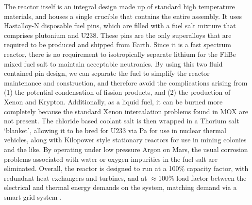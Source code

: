 \documentclass[fleqn,10pt]{Stylesheet} %
\begin{document}
The reactor itself is an integral design made up of standard high temperature materials, and houses a single crucible that contains the entire assembly. It uses Hastalloy-N disposable fuel pins, which are filled with a fuel salt mixture that comprises plutonium and U238. These pins are the only superalloys that are required to be produced and shipped from Earth. Since it is a fast spectrum reactor, there is no requirement to isotropically separate lithium for the FliBe mixed fuel salt to maintain acceptable neutronics. By using this two fluid contained pin design, we can separate the fuel to simplify the reactor maintenance and construction, and therefore avoid the complications arising from (1) the potential condensation of fission products, and (2) the production of Xenon and Krypton. Additionally, as a liquid fuel, it can be burned more completely because the standard Xenon intercalation problems found in MOX are not present. The chloride based coolant salt is then wrapped in a Thorium salt ‘blanket’, allowing it to be bred for U233 via Pa for use in nuclear thermal vehicles, along with Kilopower style stationary reactors for use in mining colonies and the like. By operating under low pressure Argon on Mars, the usual corrosion problems associated with water or oxygen impurities in the fuel salt are eliminated. Overall, the reactor is designed to run at a 100\% capacity factor, with redundant heat exchangers and turbines, and at $\approx$100\% load factor between the electrical and thermal energy demands on the system, matching demand via a smart grid system \cite{Shultis2016}. 
\end{document}

